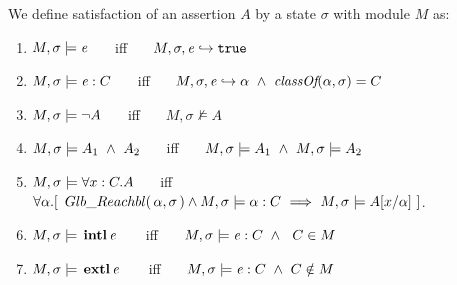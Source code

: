 \begin{definition} 
\label{def:chainmail-semantics}
We define satisfaction of an assertion $A$ by a %
state $\sigma$ with 
 module $M$ as:
\begin{enumerate}
\item
\label{cExpr}
$M , \sigma \models {\mathit{e}}$ \ \ \ iff \ \ \  $M, \sigma, {\mathit{e}} \hookrightarrow \texttt{true}$
\item
\label{cClass}
$M , \sigma \models {{\mathit{e}}} : C$ \ \ \ iff \ \ \  $M, \sigma, {\mathit{e}} \hookrightarrow \alpha\   \wedge \ \textit{classOf}(\alpha, \sigma)= C$
\item
$M , \sigma \models \neg A$ \ \ \ iff \ \ \  ${M},{\sigma}\nvDash{A}$
\item
$\satisfiesA{M}{\sigma}{A_1\ \wedge\ A_2}$ \ \ \ iff \ \ \  $\satisfiesA{M}{\sigma}{A_1} \   \wedge \ \satisfiesA{M}{\sigma}{A_2}$

\item
\label{quant1}
$M , \sigma \models \forall x:C.A$ \ \ \ iff \ \ \  
 {$\forall \alpha.[\ \GRelevant \alpha \sigma \wedge  \satisfiesA {M}{\sigma} {\alpha:C}  \ \Longrightarrow   \ \satisfiesA{M}{\sigma} {A[x/\alpha]}\ ]$.} 

\item
\label{cInternal}
$M , \sigma \models {\ensuremath{\, \mathbf{intl}}\, {\mathit{e}}\, }$ \ \ \ iff \ \ \   $M , \sigma \models {{\mathit{e}}} : C \ \wedge\ \ C \in M$
\item
\label{cExternal}
$M , \sigma \models {\ensuremath{\, \mathbf{extl}}\, {\mathit{e}}\, }$ \ \ \ iff \ \ \   $M , \sigma \models {{\mathit{e}}} : C \ \wedge \ C \notin M$
\end{enumerate}
\end{definition}

